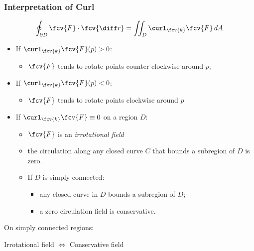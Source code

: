 \begin{frame}
\small
  \frametitle{Interpretation of Curl}

  $$\oint_{\partial D} \fcv{F} \cdot \fcv{\diff r} = \iint_D \curl_{\fcv{k}} \fcv{F} \, dA $$

  \begin{itemize}
    \item If $\curl_{\fcv{k}} \fcv{F}(p)>0$:
    \begin{itemize}
      \item \pause $\fcv{F}$ tends to rotate points counter-clockwise around $p$;
    \end{itemize}

    \item If $\curl_{\fcv{k}} \fcv{F}(p)<0$:
    \begin{itemize}
      \item \pause $\fcv{F}$ tends to rotate points clockwise around $p$
    \end{itemize}

    \item If $\curl_{\fcv{k}} \fcv{F} \equiv 0$ on a region $D$:
    \begin{itemize}
      \item \pause $\fcv{F}$ is an \emph{irrotational field}
      \item \pause the circulation along any closed curve $C$ that bounds a subregion of $D$ is zero.
      \item \pause If $D$ is simply connected:
      \begin{itemize}
        \item \pause any closed curve in $D$ bounds a subregion of $D$;
        \item \pause a zero circulation field is conservative.
      \end{itemize}
    \end{itemize}
  \end{itemize}

\pause On simply connected regions:
\begin{center}
  Irrotational field $\Longleftrightarrow$ Conservative field
\end{center}

\end{frame}
